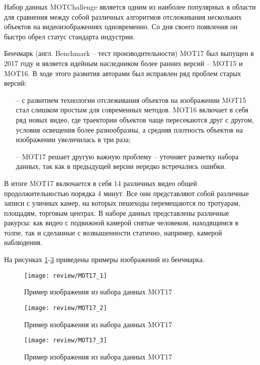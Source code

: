 Набор данных MOTChallenge \cite{dendorfer2021motchallenge} является одним из наиболее популярных в области для сравнения между собой различных алгоритмов отслеживания нескольких объектов на видеоизображениях одновременно. 
Со дня своего появления он быстро обрел статус стандарта индустрии. 

Бенчмарк (англ. Benchmark -- тест производительности) MOT17 был выпущен в 2017 году и является идейным наследником более ранних версий -- MOT15 и MOT16. В ходе этого развития авторами был исправлен ряд проблем старых версий:
\begin{itemize}
    \item[--] с развитием технологии отслеживания объектов на изображении MOT15 стал слишком простым для современных методов. MOT16 включает в себя ряд новых видео, где траектории объектов чаще пересекаются друг с другом, условия освещения более разнообразны, а средняя плотность объектов на изображении увеличилась в три раза;
    \item[--] MOT17 решает другую важную проблему -- уточняет разметку набора данных, так как в предыдущей версии нередко встречались ошибки. 
\end{itemize}

В итоге MOT17 включается в себя 14 различных видео общей продолжительностью порядка 4 минут. Все они представляют собой различные записи с уличных камер, на которых пешеходы перемещаются по тротуарам, площадям, торговым центрах. 
В наборе данных представлены различные ракурсы: как видео с подвижной камерой снятые человеком, находящимся в толпе, так и сделанные с возвышенности статично, например, камерой наблюдения.

На рисунках \ref{fig:mot_1}-\ref{fig:mot_3} приведены примеры изображений из бенчмарка.

\begin{figure}[ht]
    \centering
    \texttt{[image: review/MOT17\_1]}
    \caption{Пример изображения из набора данных MOT17 \cite[страница 850, рисунок 3]{dendorfer2021motchallenge}}
    \label{fig:mot_1}
\end{figure}

\begin{figure}[ht]
    \centering
    \texttt{[image: review/MOT17\_2]}
    \caption{Пример изображения из набора данных MOT17 \cite[страница 850, рисунок 3]{dendorfer2021motchallenge}}
    \label{fig:mot_2}
\end{figure}

\begin{figure}[ht]
    \centering
    \texttt{[image: review/MOT17\_3]}
    \caption{Пример изображения из набора данных MOT17\cite[страница 850, рисунок 3]{dendorfer2021motchallenge}}
    \label{fig:mot_3}
\end{figure}

\FloatBarrier